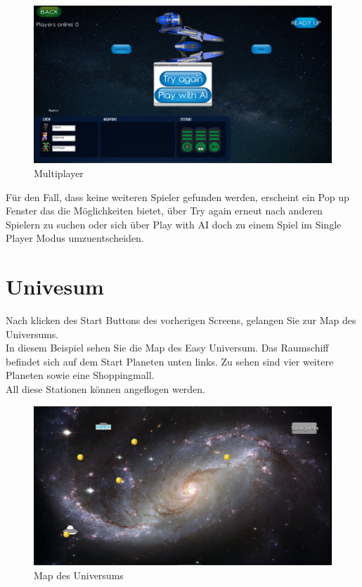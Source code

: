 \documentclass[fontsize=12pt,paper=a4,twoside]{scrartcl}
\begin{document}
\begin{figure}[htp]
	\centering
	\includegraphics[width=1.00\linewidth]{pics/MultiPlayer01.png}
	\caption{Multiplayer}
	\label{fig1}
\end{figure}

Für den Fall, dass keine weiteren Spieler gefunden werden, erscheint ein Pop up Fenster das die Möglichkeiten bietet, über Try again erneut nach anderen Spielern zu suchen
oder sich über Play with AI doch zu einem Spiel im Single Player Modus umzuentscheiden.\\
 
\newpage
\section{Univesum}

Nach klicken des Start Buttons des vorherigen Screens, gelangen Sie zur Map des Universums.\\
In diesem Beispiel sehen Sie die Map des Easy Universum. Das Raumschiff befindet sich auf dem Start Planeten unten links. Zu sehen sind vier weitere Planeten sowie eine Shoppingmall.\\
All diese Stationen können angeflogen werden.
\begin{figure}[htp]
	\centering
	\includegraphics[width=1.00\linewidth]{pics/universeEasyP1.png}
	\caption{Map des Universums}
	\label{fig1}
\end{figure}
\end{document}
